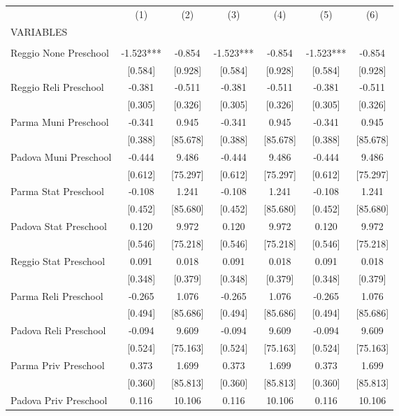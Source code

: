 \begin{tabular}{lcccccc} \hline
 & (1) & (2) & (3) & (4) & (5) & (6) \\
VARIABLES &  &  &  &  &  &  \\ \hline
 &  &  &  &  &  &  \\
Reggio None Preschool & -1.523*** & -0.854 & -1.523*** & -0.854 & -1.523*** & -0.854 \\
 & [0.584] & [0.928] & [0.584] & [0.928] & [0.584] & [0.928] \\
Reggio Reli Preschool & -0.381 & -0.511 & -0.381 & -0.511 & -0.381 & -0.511 \\
 & [0.305] & [0.326] & [0.305] & [0.326] & [0.305] & [0.326] \\
Parma Muni Preschool & -0.341 & 0.945 & -0.341 & 0.945 & -0.341 & 0.945 \\
 & [0.388] & [85.678] & [0.388] & [85.678] & [0.388] & [85.678] \\
Padova Muni Preschool & -0.444 & 9.486 & -0.444 & 9.486 & -0.444 & 9.486 \\
 & [0.612] & [75.297] & [0.612] & [75.297] & [0.612] & [75.297] \\
Parma Stat Preschool & -0.108 & 1.241 & -0.108 & 1.241 & -0.108 & 1.241 \\
 & [0.452] & [85.680] & [0.452] & [85.680] & [0.452] & [85.680] \\
Padova Stat Preschool & 0.120 & 9.972 & 0.120 & 9.972 & 0.120 & 9.972 \\
 & [0.546] & [75.218] & [0.546] & [75.218] & [0.546] & [75.218] \\
Reggio Stat Preschool & 0.091 & 0.018 & 0.091 & 0.018 & 0.091 & 0.018 \\
 & [0.348] & [0.379] & [0.348] & [0.379] & [0.348] & [0.379] \\
Parma Reli Preschool & -0.265 & 1.076 & -0.265 & 1.076 & -0.265 & 1.076 \\
 & [0.494] & [85.686] & [0.494] & [85.686] & [0.494] & [85.686] \\
Padova Reli Preschool & -0.094 & 9.609 & -0.094 & 9.609 & -0.094 & 9.609 \\
 & [0.524] & [75.163] & [0.524] & [75.163] & [0.524] & [75.163] \\
Parma Priv Preschool & 0.373 & 1.699 & 0.373 & 1.699 & 0.373 & 1.699 \\
 & [0.360] & [85.813] & [0.360] & [85.813] & [0.360] & [85.813] \\
Padova Priv Preschool & 0.116 & 10.106 & 0.116 & 10.106 & 0.116 & 10.106 \\

\end{tabular}
